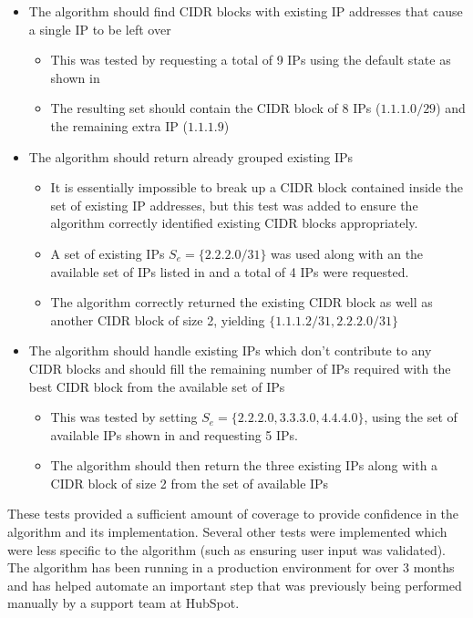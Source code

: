 \begin{itemize}
\begin{itemize}
      \end{itemize}
\item{The algorithm should find CIDR blocks with existing IP addresses that cause a single IP to be left over}
      \begin{itemize}
      \item{This was tested by requesting a total of 9 IPs using the default state as shown in }
      \item{The resulting set should contain the CIDR block of 8 IPs ($1.1.1.0/29$) and the remaining extra IP ($1.1.1.9$)}
      \end{itemize}
\item{The algorithm should return already grouped existing IPs}
      \begin{itemize}
      \item{It is essentially impossible to break up a CIDR block contained inside the set of existing IP addresses, but this test was added to ensure the algorithm correctly identified existing CIDR blocks appropriately.}
      \item{A set of existing IPs $S_e = \{2.2.2.0/31\}$ was used along with an the available set of IPs listed in  and a total of 4 IPs were requested.}
      \item{The algorithm correctly returned the existing CIDR block as well as another CIDR block of size 2, yielding $\{1.1.1.2/31, 2.2.2.0/31\}$}
      \end{itemize}
\item{The algorithm should handle existing IPs which don't contribute to any CIDR blocks and should fill the remaining number of IPs required with the best CIDR block from the available set of IPs}
      \begin{itemize}
      \item{This was tested by setting $S_e = \{2.2.2.0, 3.3.3.0, 4.4.4.0\}$}, using the set of available IPs shown in  and requesting 5 IPs.
      \item{The algorithm should then return the three existing IPs along with a CIDR block of size 2 from the set of available IPs}
      \end{itemize}
\end{itemize}

These tests provided a sufficient amount of coverage to provide confidence in the algorithm and its implementation. Several other tests were implemented which were less specific to the algorithm (such as ensuring user input was validated). The algorithm has been running in a production environment for over 3 months and has helped automate an important step that was previously being performed manually by a support team at HubSpot.   